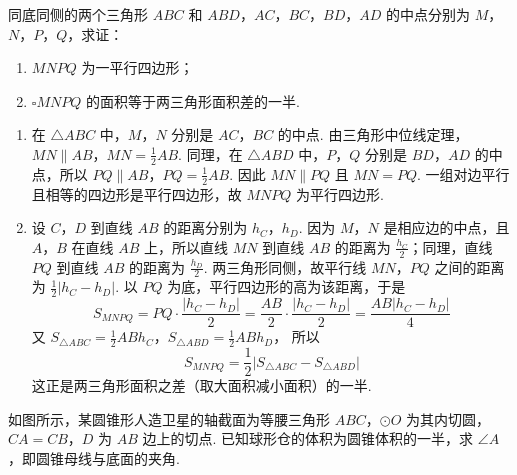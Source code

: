 \begin{problem}
同底同侧的两个三角形 \(ABC\) 和 \(ABD\)，\(AC\)，\(BC\)，\(BD\)，\(AD\) 的中点分别为 \(M\)，\(N\)，\(P\)，\(Q\)，求证：

\begin{enumerate}
\item \(MNPQ\) 为一平行四边形；
\item \(\square MNPQ\) 的面积等于两三角形面积差的一半.
\end{enumerate}
\end{problem}

\begin{solution}
\begin{enumerate}
\item 在 \(\triangle ABC\) 中，\(M\)，\(N\) 分别是 \(AC\)，\(BC\) 的中点. 由三角形中位线定理，
\(MN\parallel AB\)，\(MN=\frac{1}{2}AB\).
同理，在 \(\triangle ABD\) 中，\(P\)，\(Q\) 分别是 \(BD\)，\(AD\) 的中点，所以
\(PQ\parallel AB\)，\(PQ=\frac{1}{2}AB\).
因此 \(MN\parallel PQ\) 且 \(MN=PQ\). 一组对边平行且相等的四边形是平行四边形，故 \(MNPQ\) 为平行四边形.

\item 设 \(C\)，\(D\) 到直线 \(AB\) 的距离分别为 \(h_C\)，\(h_D\). 因为 \(M\)，\(N\) 是相应边的中点，且 \(A\)，\(B\) 在直线 \(AB\) 上，所以直线 \(MN\) 到直线 \(AB\) 的距离为 \(\frac{h_C}{2}\)；同理，直线 \(PQ\) 到直线 \(AB\) 的距离为 \(\frac{h_D}{2}\). 两三角形同侧，故平行线 \(MN\)，\(PQ\) 之间的距离为 \(\frac{1}{2}\lvert h_C-h_D\rvert\). 以 \(PQ\) 为底，平行四边形的高为该距离，于是
\[
S_{MNPQ}=PQ\cdot\frac{\lvert h_C-h_D\rvert}{2}
=\frac{AB}{2}\cdot\frac{\lvert h_C-h_D\rvert}{2}
=\frac{AB\lvert h_C-h_D\rvert}{4}
\]
又
\(S_{\triangle ABC}=\frac{1}{2}ABh_C\)，\(S_{\triangle ABD}=\frac{1}{2}ABh_D\)，
所以
\[
S_{MNPQ}=\frac{1}{2}\left\lvert S_{\triangle ABC}-S_{\triangle ABD}\right\rvert
\]
这正是两三角形面积之差（取大面积减小面积）的一半.
\end{enumerate}
\end{solution}

\begin{problem}
如图所示，某圆锥形人造卫星的轴截面为等腰三角形 \(ABC\)，\(\odot O\) 为其内切圆，\(CA=CB\)，\(D\) 为 \(AB\) 边上的切点. 已知球形仓的体积为圆锥体积的一半，求 \(\angle A\)，即圆锥母线与底面的夹角.

\end{problem}

